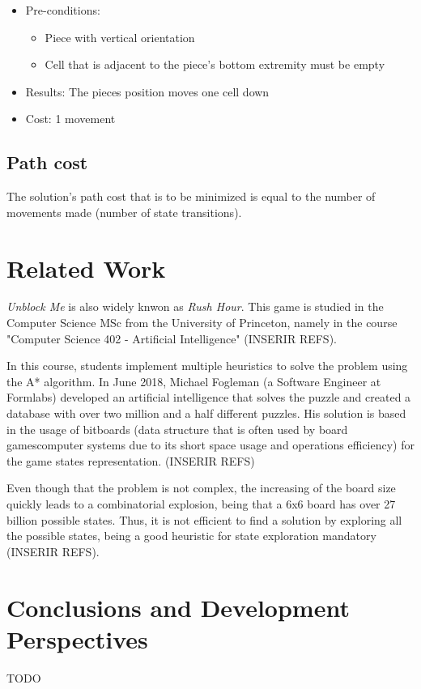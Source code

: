 \documentclass[conference]{IEEEtran}
\begin{document}
\begin{itemize}
    \begin{itemize}
        \item Pre-conditions:
        \begin{itemize}
            \item Piece with vertical orientation
            \item Cell that is adjacent to the piece's bottom extremity must be empty
        \end{itemize}
        \item Results: The pieces position moves one cell down
        \item Cost: 1 movement
    \end{itemize}
\end{itemize}

\subsection{Path cost}
The solution's path cost that is to be minimized is equal to the number of movements made (number of state transitions).


\section{Related Work}
\textit{Unblock Me} is also widely knwon as \textit{Rush Hour}. This game is studied in the Computer Science MSc from the University of Princeton, namely in the course "Computer Science 402 - Artificial Intelligence" (INSERIR REFS).

In this course, students implement multiple heuristics to solve the problem using the A* algorithm. In June 2018, Michael Fogleman (a Software Engineer at Formlabs) developed an artificial intelligence that solves the puzzle and created a database with over two million and a half different puzzles. His solution is based in the usage of bitboards (data structure that is often used by board gamescomputer systems due to its short space usage and operations efficiency) for the game states representation. (INSERIR REFS)

Even though that the problem is not complex, the increasing of the board size quickly leads to a combinatorial explosion, being that a 6x6 board has over 27 billion possible states. Thus, it is not efficient to find a solution by exploring all the possible states, being a good heuristic for state exploration mandatory (INSERIR REFS).

\section{Conclusions and Development Perspectives}
TODO
\end{document}
